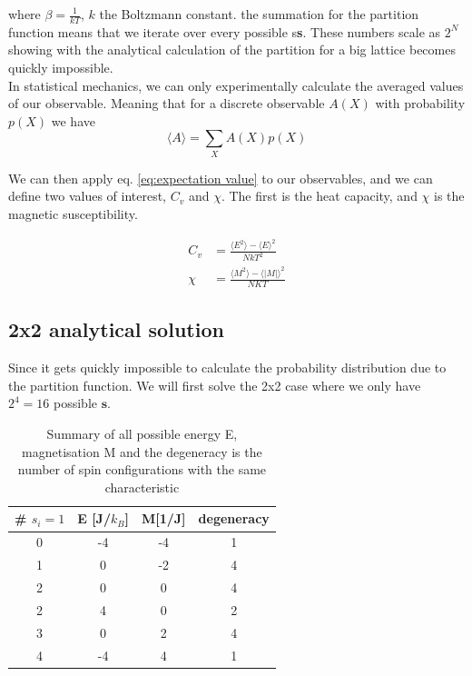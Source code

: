 \documentclass[english,notitlepage,reprint,nofootinbib]{revtex4-2}  %
\begin{document}
	where $\beta = \frac{1}{kT}$, $k$ the Boltzmann constant. the summation for the partition
	function means that we iterate over every possible s\textbf{s}. These numbers scale as $2^N$
	showing with the analytical calculation of the partition for a big lattice becomes quickly
	impossible. \\

	In statistical mechanics, we can only experimentally calculate the averaged values of our
	observable. Meaning that for a discrete observable $A(X)$ with probability $p(X)$ we have
	\begin{equation}
		\langle A \rangle = \sum_{X}A(X)p(X) \label{eq:expectation value}
	\end{equation}

	We can then apply eq. \ref{eq:expectation value} to our observables, and we can define two
	values of interest, $C_v$ and $\chi$. The first is the heat capacity, and $\chi$ is the
	magnetic susceptibility.

	\begin{align}
		C_v &= \frac{\langle E^2 \rangle - \langle E \rangle^2}{NkT^2} \label{eq:heat_capacity} \\
		\chi &= \frac{\langle M^2 \rangle - \langle |M| \rangle^2}{NKT} \label{eq:susceptibility}
	\end{align}

	\subsection{2x2 analytical solution}\label{subsec:analytical solution}

	Since it gets quickly impossible to calculate the probability distribution due to the
	partition function. We will first solve the 2x2 case where we only have $2^4=16$ possible
	$\textbf{s}$.

	\begin{table}[h!]
	\centering
	\begin{tabular}{|c|c|c|c|}
		\hline
		\# $s_i=1$ & E [J/$k_{B}$] & M[1/J] & degeneracy \\
		\hline
		\hline
		0 & -4 &  -4 &  1  \\
		1 & 0&   -2&   4  \\
		2 & 0 & 0&  4  \\
		2 & 4 & 0 &  2 \\
		3 & 0  & 2 & 4 \\
		4 & -4 & 4 & 1 \\
		\hline
	\end{tabular}
	\caption{ Summary of all possible energy E, magnetisation M and the degeneracy is the
	number of spin configurations with the same characteristic} \label{tab:summary2x2}
	\end{table}
\end{document}
